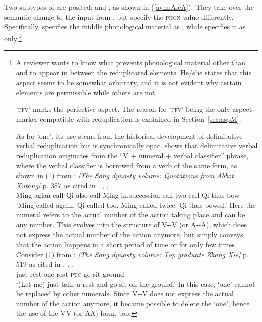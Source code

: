 Two subtypes of  are posited:
and , as shown in (\ref{avm:AleA}). %
They take over the semantic change to the input from , but specify the \textsc{phon} value differently.
Specifically,  specifies the middle phonological material as
, while  specifies it as  only.\footnote{
A reviewer wants to know what prevents phonological material other than  and  to appear in between the reduplicated elements.
He/she states that this aspect seems to be somewhat arbitrary, and it is not evident why certain elements are permissible while others are not.

 `\textsc{pfv}' marks the perfective aspect.
The reason for  `\textsc{pfv}' being the only aspect marker compatible with reduplication is explained in Section~\ref{sec:aspM}.

As for  `one', its use stems from the historical development of delimitative verbal reduplication but is synchronically opac.
\citet[13--15]{Zhang2000} shows that delimitative verbal reduplication originates from the ``V + numeral + verbal classifier'' phrase,
where the verbal classifier is borrowed from a verb of the same form, as shown in (\ref{ex:hist1}) from  :    \textit{[The Song dynasty volume: Quotations from Abbot Xutang]} p. 387 as cited in \citet[12]{Zhang2000}.
\ea\label{ex:hist1}
\gll {}  ,   ,     ,   \\
Ming agian call Qi also call Ming in.succession call two call Qi thus bow\\
\glt `Ming called again. Qi called too. Ming called twice. Qi thus bowed.'
\z
Here the numeral refers to the actual number of the action taking place
and can be any number.
This evolves into the structure of V--V (or A--A), which does not express the actual number of the action anymore,
but simply conveys that the action happens in a short period of time or for only few times. 
Consider (\ref{ex:hist2}) from  :    \textit{[The Song dynasty volume: Top graduate Zhang Xie]} p. 519 as cited in \citet[13]{Zhang2000}.
\ea\label{ex:hist2}
\gll {}  ,   .\\
just rest-one-rest \textsc{ptc} go sit ground\\
\glt `(Let me) just take a rest and go sit on the ground.'
\z
In this case,  `one' cannot be replaced by other numerals.
Since V--V does not express the actual number of the action anymore,
it became possible to delete the  `one',
hence the use of the VV (or AA) form, too.

}
